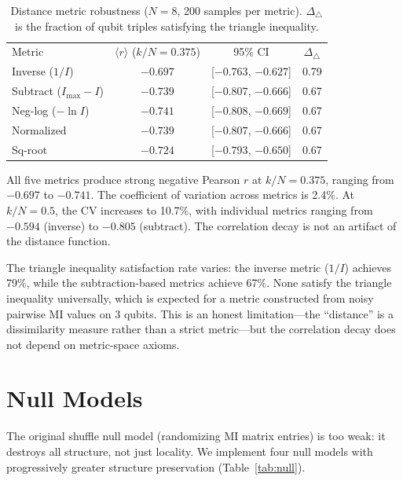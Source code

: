 \documentclass[aps,pra,twocolumn,superscriptaddress]{revtex4-2}
\begin{document}
\begin{table}[b]
\caption{Distance metric robustness ($N = 8$, 200 samples per metric). $\Delta_\triangle$ is the fraction of qubit triples satisfying the triangle inequality.}
\label{tab:distance}
\begin{ruledtabular}
\begin{tabular}{lccc}
Metric & $\langle r \rangle$ ($k/N = 0.375$) & 95\% CI & $\Delta_\triangle$ \\
\colrule
Inverse ($1/I$) & $-0.697$ & [$-0.763$, $-0.627$] & 0.79 \\
Subtract ($I_\text{max} - I$) & $-0.739$ & [$-0.807$, $-0.666$] & 0.67 \\
Neg-log ($-\ln I$) & $-0.741$ & [$-0.808$, $-0.669$] & 0.67 \\
Normalized & $-0.739$ & [$-0.807$, $-0.666$] & 0.67 \\
Sq-root & $-0.724$ & [$-0.793$, $-0.650$] & 0.67 \\
\end{tabular}
\end{ruledtabular}
\end{table}

All five metrics produce strong negative Pearson $r$ at $k/N = 0.375$, ranging from $-0.697$ to $-0.741$. The coefficient of variation across metrics is 2.4\%. At $k/N = 0.5$, the CV increases to 10.7\%, with individual metrics ranging from $-0.594$ (inverse) to $-0.805$ (subtract). The correlation decay is not an artifact of the distance function.

The triangle inequality satisfaction rate varies: the inverse metric ($1/I$) achieves 79\%, while the subtraction-based metrics achieve 67\%. None satisfy the triangle inequality universally, which is expected for a metric constructed from noisy pairwise MI values on 3 qubits. This is an honest limitation---the ``distance'' is a dissimilarity measure rather than a strict metric---but the correlation decay does not depend on metric-space axioms.


\section{Null Models}
\label{sec:nulls}

The original shuffle null model (randomizing MI matrix entries) is too weak: it destroys all structure, not just locality. We implement four null models with progressively greater structure preservation (Table~\ref{tab:null}).
\end{document}
